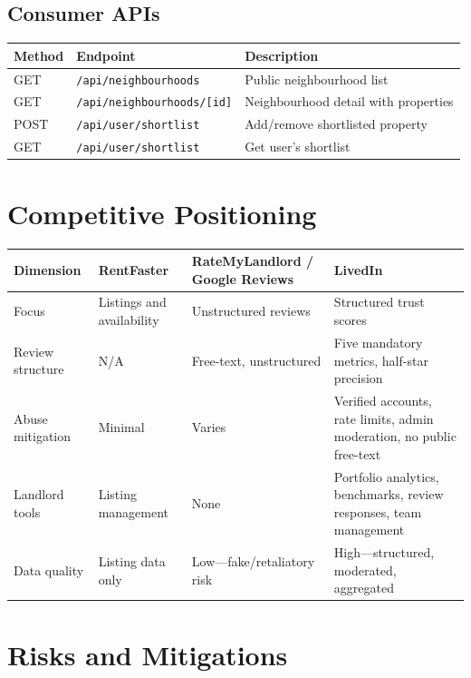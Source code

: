 \documentclass[11pt,letterpaper]{article}
\begin{document}
\subsection{Consumer APIs}

\begin{longtable}{l l p{6cm}}
\toprule
\textbf{Method} & \textbf{Endpoint} & \textbf{Description} \\
\midrule
\endhead
GET  & \texttt{/api/neighbourhoods}      & Public neighbourhood list \\
GET  & \texttt{/api/neighbourhoods/[id]}  & Neighbourhood detail with properties \\
POST & \texttt{/api/user/shortlist}       & Add/remove shortlisted property \\
GET  & \texttt{/api/user/shortlist}       & Get user's shortlist \\
\bottomrule
\end{longtable}

\section{Competitive Positioning}

\begin{longtable}{p{3cm} p{3.5cm} p{3.5cm} p{3.5cm}}
\toprule
\textbf{Dimension} & \textbf{RentFaster} & \textbf{RateMyLandlord / Google Reviews} & \textbf{LivedIn} \\
\midrule
\endhead
Focus &
Listings and availability &
Unstructured reviews &
Structured trust scores \\
\addlinespace
Review structure &
N/A &
Free-text, unstructured &
Five mandatory metrics, half-star precision \\
\addlinespace
Abuse mitigation &
Minimal &
Varies &
Verified accounts, rate limits, admin moderation, no public free-text \\
\addlinespace
Landlord tools &
Listing management &
None &
Portfolio analytics, benchmarks, review responses, team management \\
\addlinespace
Data quality &
Listing data only &
Low---fake/retaliatory risk &
High---structured, moderated, aggregated \\
\bottomrule
\end{longtable}

\section{Risks and Mitigations}
\end{document}

